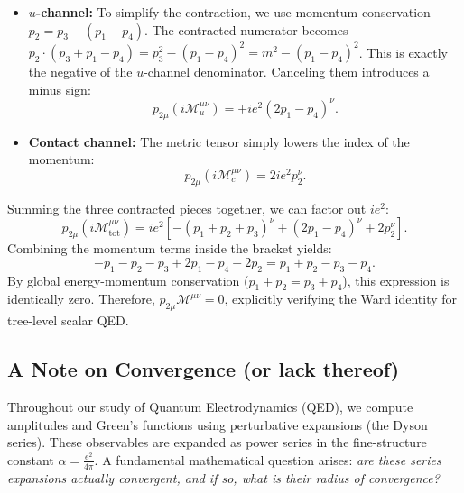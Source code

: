 \begin{example}
\begin{itemize}
        \item \textbf{$u$-channel:} To simplify the contraction, we use momentum conservation $p_2 = p_3 - (p_1-p_4)$. The contracted numerator becomes $p_2 \cdot (p_3 + p_1 - p_4) = p_3^2 - (p_1-p_4)^2 = m^2 - (p_1-p_4)^2$. This is exactly the negative of the $u$-channel denominator. Canceling them introduces a minus sign:
              \[
                  p_{2\mu} (i\mathcal{M}_u^{\mu\nu}) = +ie^2 (2p_1-p_4)^\nu.
              \]

        \item \textbf{Contact channel:} The metric tensor simply lowers the index of the momentum:
              \[
                  p_{2\mu} (i\mathcal{M}_c^{\mu\nu}) = 2ie^2 p_2^\nu.
              \]
    \end{itemize}

    Summing the three contracted pieces together, we can factor out $ie^2$:
    \[
        p_{2\mu} (i\mathcal{M}^{\mu\nu}_{\text{tot}}) = ie^2 \left[ -(p_1+p_2+p_3)^\nu + (2p_1-p_4)^\nu + 2p_2^\nu \right].
    \]
    Combining the momentum terms inside the bracket yields:
    \[
        -p_1 - p_2 - p_3 + 2p_1 - p_4 + 2p_2 = p_1 + p_2 - p_3 - p_4.
    \]
    By global energy-momentum conservation ($p_1+p_2 = p_3+p_4$), this expression is identically zero. Therefore, $p_{2\mu} \mathcal{M}^{\mu\nu} = 0$, explicitly verifying the Ward identity for tree-level scalar QED.
\end{example}



























\subsection{A Note on Convergence (or lack thereof)}

Throughout our study of Quantum Electrodynamics (QED), we compute amplitudes and Green's functions using perturbative expansions (the Dyson series). These observables are expanded as power series in the fine-structure constant \(\alpha = \frac{e^2}{4\pi}\). A fundamental mathematical question arises: \textit{are these series expansions actually convergent, and if so, what is their radius of convergence?}

